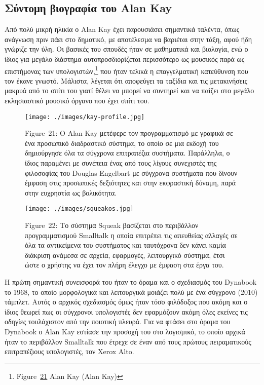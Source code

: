 \documentclass[
]{article}
\begin{document}
\hypertarget{ux3c3ux3cdux3bdux3c4ux3bfux3bcux3b7-ux3b2ux3b9ux3bfux3b3ux3c1ux3b1ux3c6ux3afux3b1-ux3c4ux3bfux3c5-alan-kay}{%
\subsection{Σύντομη βιογραφία του Alan
Kay}\label{ux3c3ux3cdux3bdux3c4ux3bfux3bcux3b7-ux3b2ux3b9ux3bfux3b3ux3c1ux3b1ux3c6ux3afux3b1-ux3c4ux3bfux3c5-alan-kay}}

Από πολύ μικρή ηλικία ο Alan Kay έχει παρουσιάσει σημαντικά ταλέντα,
όπως ανάγνωση πριν πάει στο δημοτικό, με αποτέλεσμα να βαριέται στην
τάξη, αφού ήδη γνώριζε την ύλη. Οι βασικές του σπουδές ήταν σε
μαθηματικά και βιολογία, ενώ ο ίδιος για μεγάλο διάστημα
αυτοπροσδιορίζεται περισσότερο ως μουσικός παρά ως επιστήμονας των
υπολογιστών,\footnote{Figure~\protect\hyperlink{fig:kay-profile}{21}
  Alan Kay (Alan Kay)} που ήταν τελικά η επαγγελματική κατεύθυνση που
τον έκανε γνωστό. Μάλιστα, λέγεται ότι αποφεύγει τα ταξίδια και τις
μετακινήσεις μακρυά από το σπίτι του γιατί θέλει να μπορεί να συντηρεί
και να παίζει στο μεγάλο εκλησιαστικό μουσικό όργανο που έχει σπίτι του.

\leavevmode{}%
\begin{figure}
\hypertarget{fig:kay-profile}{%
\centering
\texttt{[image: ./images/kay-profile.jpg]}
\caption{Figure~21: Ο Alan Kay μετέφερε τον προγραμματισμό με γραφικά σε
ένα προσωπικό διαδραστικό σύστημα, το οποίο σε μια εκδοχή του
δημιούργησε όλα τα σύγχρονα επιτραπέζια συστήματα. Παράλληλα, ο ίδιος
παραμένει με συνέπεια ένας από τους λίγους συνεχιστές της φιλοσοφίας του
Douglas Engelbart με σύγχρονα συστήματα που δίνουν έμφαση στις
προσωπικές δεξιότητες και στην εκφραστική δύναμη, παρά στην ευχρηστία ως
βολικότητα.}\label{fig:kay-profile}
}
\end{figure}

\leavevmode{}%
\begin{figure}
\hypertarget{fig:squeakos}{%
\centering
\texttt{[image: ./images/squeakos.jpg]}
\caption{Figure~22: Το σύστημα Squeak βασίζεται στο περιβάλλον
προγραμματισμού Smalltalk η οποία επιτρέπει τις απευθείας αλλαγές σε όλα
τα αντικείμενα του συστήματος και ταυτόχρονα δεν κάνει καμία διάκριση
ανάμεσα σε αρχεία, εφαρμογές, λειτουργικό σύστημα, έτσι ώστε ο χρήστης
να έχει τον πλήρη έλεγχο με έμφαση στα έργα του.}\label{fig:squeakos}
}
\end{figure}

Η πρώτη σημαντική συνεισφορά του ήταν το όραμα και ο σχεδιασμός του
Dynabook το 1968, το οποίο μορφολογικά και λειτουργικά μοιάζει πολύ με
ένα σύγχρονο (2010) τάμπλετ. Αυτός ο αρχικός σχεδιασμός όμως ήταν τόσο
φιλόδοξος που ακόμη και ο ίδιος θεωρεί πως οι σύγχρονοι υπολογιστές δεν
εφαρμόζουν ακόμη όλες εκείνες τις οδηγίες τουλάχιστον από την ποιοτική
πλευρά. Για να φτάσει στο όραμα του Dynabook ο Alan Kay εστίασε την
προσοχή του στο λογισμικό, το οποίο αρχικά ήταν το περιβάλλον Smalltalk
που έτρεχε σε έναν από τους πρώτους πειραματικούς επιτραπέζιους
υπολογιστές, τον Xerox Alto.
\end{document}
